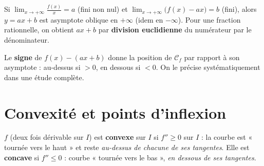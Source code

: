 \begin{propriete}
Si $\displaystyle\lim_{x\to+\infty}\frac{f(x)}{x}=a$ (fini non nul) et
$\displaystyle\lim_{x\to+\infty}\big(f(x)-ax\big)=b$ (fini), alors $y=ax+b$ est asymptote
oblique en $+\infty$ (idem en $-\infty$). Pour une fraction rationnelle, on obtient $ax+b$ par
\textbf{division euclidienne} du numérateur par le dénominateur.
\end{propriete}

\begin{remarque}
Le \textbf{signe} de $f(x)-(ax+b)$ donne la position de $\mathcal C_f$ par rapport à
son asymptote : au-dessus si $>0$, en dessous si $<0$. On le précise systématiquement
dans une étude complète.
\end{remarque}

\begin{illus}
\end{illus}

\section{Convexité et points d'inflexion}

\begin{definition}
$f$ (deux fois dérivable sur $I$) est \textbf{convexe} sur $I$ si $f''\ge0$ sur $I$ : la courbe
est « tournée vers le haut » et reste \emph{au-dessus de chacune de ses tangentes}.
Elle est \textbf{concave} si $f''\le0$ : courbe « tournée vers le bas », \emph{en dessous de ses tangentes}.
\end{definition}

